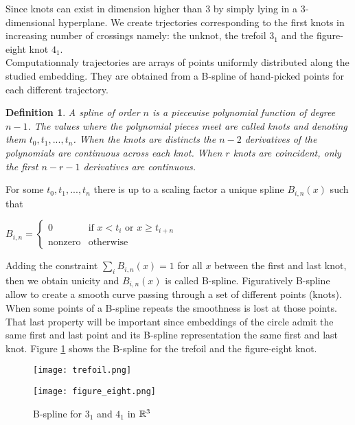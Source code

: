 \documentclass[12pt, a4paper]{article}
\newtheorem{definition}{Definition}
\begin{document}
Since knots can exist in dimension higher than $3$ by simply lying in a 3-dimensional hyperplane. We create trjectories corresponding to the first knots in increasing number of crossings namely: the unknot, the trefoil $3_1$ and the figure-eight knot $4_1$.\\

Computationnaly trajectories are arrays of points uniformly distributed along the studied embedding. They are obtained from a B-spline of hand-picked points for each different trajectory.\\

\begin{definition}
  A spline of order $n$ is a piecewise polynomial function of degree $n-1$. The values where the polynomial pieces meet are called knots and denoting them $t_0,t_1, ... , t_n$. When the knots are distincts the $n-2$ derivatives of the polynomials are continuous across each knot. When $r$ knots are coincident, only the first $n-r-1$ derivatives are continuous.
\end{definition}

For some $t_0, t_1, ... , t_n$ there is up to a scaling factor a unique spline $B_{i,n}(x)$ such that

\begin{center}
  $B_{i,n} = 
  \begin{cases}
    0 &\text{if $x < t_i$ or $x \ge t_{i+n}$}\\
    \text{nonzero} & \text{otherwise}
  \end{cases}$
\end{center}

Adding the constraint $\sum\limits_i B_{i,n}(x) = 1$ for all $x$ between the first and last knot, then we obtain unicity and $B_{i,n}(x)$ is called B-spline. Figuratively B-spline allow to create a smooth curve passing through a set of different points (knots). When some points of a B-spline repeats the smoothness is lost at those points. That last property will be important since embeddings of the circle admit the same first and last point and its B-spline representation the same first and last knot. Figure \ref{fig:knot_bspline} shows the B-spline for the trefoil and the figure-eight knot. 

\begin{figure}[H]
  \begin{minipage}[c]{.5\linewidth}
             \centering
            \texttt{[image: trefoil.png]}
         \end{minipage}
         \hfill%
         \begin{minipage}[c]{.5\linewidth}
             \centering
             \texttt{[image: figure\_eight.png]}
        \end{minipage}
        \caption{B-spline for $3_1$ and $4_1$ in $\mathbb{R}^3$}
        \label{fig:knot_bspline}
\end{figure}
\end{document}
